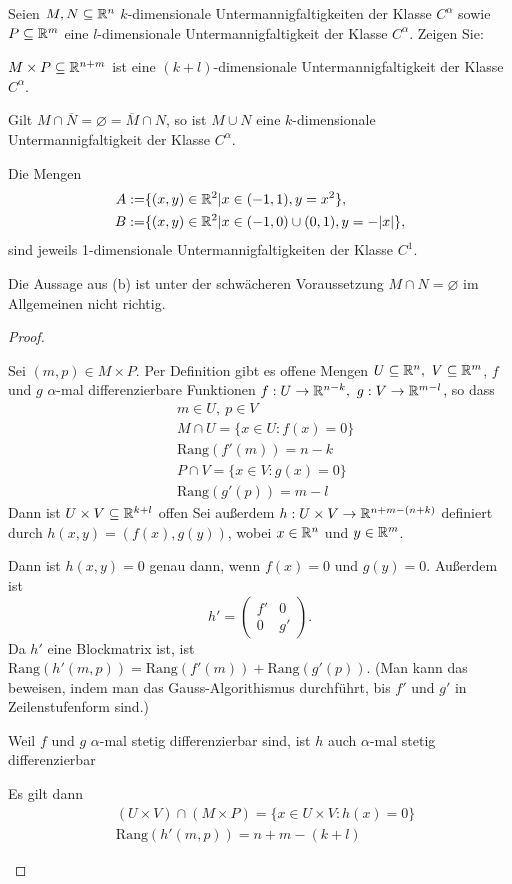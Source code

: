 \begin{Problem}
	Seien $M,N\subseteq \mathbb{R}^n$ $k$-dimensionale Untermannigfaltigkeiten der Klasse $C^\alpha$ sowie $P\subseteq \mathbb{R}^m$ eine $l$-dimensionale Untermannigfaltigkeit der Klasse $C^\alpha$. Zeigen Sie:
	\begin{parts}
		\item $M\times P\subseteq \mathbb{R}^{n+m}$ ist eine $(k+l)$-dimensionale Untermannigfaltigkeit der Klasse $C^\alpha$.
		\item Gilt $M\cap \overline{N}=\varnothing = \overline{M}\cap N$, so ist $M\cup N$ eine $k$-dimensionale Untermannigfaltigkeit der Klasse $C^\alpha$.
		\item Die Mengen
			\begin{align*}
				A:=& \{(x,y)\in \mathbb{R}^2|x\in (-1,1),y=x^2\} ,\\
				B:=& \{(x,y)\in \mathbb{R}^2|x\in (-1,0)\cup (0,1),y=-|x|\} ,
			\end{align*}
			sind jeweils 1-dimensionale Untermannigfaltigkeiten der Klasse $C^1$.
		\item Die Aussage aus (b) ist unter der schwächeren Voraussetzung $M \cap N = \varnothing$ im Allgemeinen nicht richtig.
		\end{parts}
\end{Problem}
\begin{proof}
	\begin{parts}
	\item Sei $(m,p)\in M\times P$. Per Definition gibt es offene Mengen $U\subseteq \mathbb{R}^n,~V\subseteq \mathbb{R}^m$, $f$ und $g$ $\alpha$-mal differenzierbare Funktionen $f:U\to \mathbb{R}^{n-k},~g:V\to \mathbb{R}^{m-l}$, so dass
		\begin{align*}
			&m\in U,~p\in V\\
			&M\cap U=\{x\in U:f(x)=0\}\\
			&\text{Rang}(f'(m))=n-k\\
			&P\cap V=\{x\in V:g(x)=0\} \\
			&\text{Rang}(g'(p))=m-l
		\end{align*}
		Dann ist $U\times V\subseteq \mathbb{R}^{k+l}$ offen Sei außerdem $h:U\times V\to \mathbb{R}^{n+m-(n+k)}$ definiert durch $h(x,y)=(f(x),g(y))$, wobei $x\in \mathbb{R}^{n}$ und $y\in \mathbb{R}^m$. 

Dann ist $h(x,y)=0$ genau dann, wenn $f(x)=0$ und $g(y)=0$. Außerdem ist
\[
	h'=\begin{pmatrix} f' & 0 \\ 0 & g' \end{pmatrix} 
.\] 
Da $h'$ eine Blockmatrix ist, ist $\text{Rang}(h'(m,p))=\text{Rang}(f'(m))+\text{Rang}(g'(p))$. (Man kann das beweisen, indem man das Gauss-Algorithismus durchführt, bis $f'$ und $g'$ in Zeilenstufenform sind.)

Weil $f$ und $g$ $\alpha$-mal stetig differenzierbar sind, ist $h$ auch $\alpha$-mal stetig differenzierbar

Es gilt dann
\begin{align*}
	&(U\times V)\cap (M\times P)=\{x\in U\times V:h(x)=0\} \\
	&\text{Rang}(h'(m,p))=n+m-(k+l)
\end{align*}
	\end{parts}
\end{proof}
